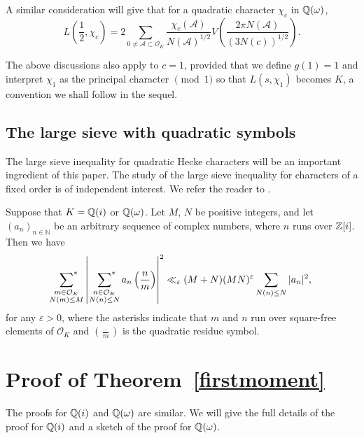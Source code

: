\documentclass[twoside,leqno,10pt, A4]{amsart}
\begin{document}
A similar consideration will give that for a quadratic character $\chi_c$ in $\mathbb Q(\omega)$, 
\begin{equation} \label{quadapproxfuneqQomega}
 L \left( \frac{1}{2}, \chi_c \right) = 2\sum_{0 \neq \mathcal{A} \subset
  \mathcal{O}_K}\frac{\chi_c(\mathcal{A})}{N(\mathcal{A})^{1/2}}V \left(\frac{2 \pi N(\mathcal{A}) }{(3N(c))^{1/2}} \right).
  \end{equation}
  
The above discussions also apply to $c=1$, provided that we define $g(1)=1$ and interpret $\chi_1$ as the principal character $\pmod 1$ so that $L(s, \chi_1)$ becomes $K$, a convention we shall follow in the sequel.


\subsection{The large sieve with quadratic symbols}  The large sieve inequality for quadratic Hecke characters will be an important ingredient of this paper.    The study of the large sieve inequality for characters of a fixed order is of independent interest.  We refer the reader to \cites{DRHB, DRHB1, G&Zhao, G&L, B&Y, BGL}.

\begin{lemma}{\cite[Theorem 1]{Onodera}} \label{quartls}
Suppose that $K= \mathbb Q(i)$ or $\mathbb Q(\omega)$.  Let $M$, $N$ be positive integers, and let $(a_n)_{n\in \mathbb{N}}$ be an arbitrary sequence of complex numbers, where $n$ runs over $\mathbb Z[i]$. Then we have
\begin{equation*}
 \sideset{}{^*}\sum_{\substack{m \in \mathcal{O}_K  \\N(m) \leq M}} \left| \ \sideset{}{^*}\sum_{\substack{n \in \mathcal{O}_K \\N(n) \leq N}} a_n \left(\frac{n}{m}\right) \right|^2
 \ll_{\varepsilon} (M + N)(MN)^{\varepsilon} \sum_{N(n) \leq N} |a_n|^2,
\end{equation*}
   for any $\varepsilon > 0$, where the asterisks indicate that $m$ and $n$ run over square-free elements of $\mathcal{O}_K$ and $(\frac
{\cdot}{m})$ is the quadratic residue symbol.
\end{lemma}


\section{Proof of Theorem~\ref{firstmoment}}

The proofs for $\mathbb Q(i)$ and $\mathbb Q(\omega)$ are similar.  We will give the full details of the proof for $\mathbb Q(i)$ and a sketch of the proof for $\mathbb Q(\omega)$.
\end{document}
